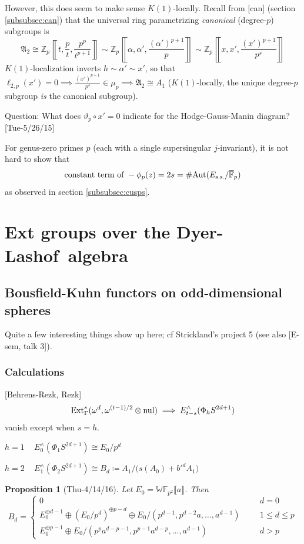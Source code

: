 \documentclass{rs}
\newtheorem{prop}[thm]{Proposition}
\theoremstyle{definition}
\theoremstyle{remark}
\newcommand{\mb}[1]{\mathbb{#1}}
\newcommand{\mf}[1]{\mathfrak{#1}}
\newcommand{\Aut}{{\rm Aut}}
\newcommand{\cF}{\overline {\mb F}}
\newcommand{\DL}{Dyer-Lashof~}
\newcommand{\BF}{{\mb F}}
\newcommand{\BW}{{\mb W}}
\newcommand{\BZ}{{\mb Z}}
\newcommand{\Ext}{{\rm Ext}}
\newcommand{\nul}{{\rm nul}}
\newcommand{\A}{\alpha}
\newcommand{\G}{\Gamma}
\newcommand{\ce}{\coloneqq}
\newcommand{\lb}{\llbracket}
\newcommand{\rb}{\rrbracket}
\renewcommand{\=}{\approx}
\renewcommand{\-}{\sim}
\numberwithin{equation}{section}
\numberwithin{thm}{section}
\begin{document}
However, this does seem to make sense $K(1)$-locally.  
Recall from [can] (section \ref{subsubsec:can}) that the universal ring parametrizing {\em canonical} (degree-$p$) subgroups is 
\[
 {\mf A_2} \cong \BZ_p \left\lb t, \frac{p}{t}, \frac{p^p}{t^{p+1}} \right\rb 
           \sim \BZ_p \left\lb \A, \A', \frac{(\A')^{p + 1}}{p} \right\rb 
           \sim \BZ_p \left\lb x, x', \frac{(x')^{p + 1}}{p^s} \right\rb 
\]
$K(1)$-localization inverts $h \sim \A' \sim x'$, so that $\ell_{2,p}(x') = 0 \implies \frac{(x')^{p + 1}}{p^s} \in \mu_p \implies {\mf A_2} \cong A_1$ 
($K(1)$-locally, the unique degree-$p$ subgroup {\em is} the canonical subgroup).  

Question: What does $\vartheta_p \circ x' = 0$ indicate for the Hodge-Gauss-Manin diagram?  [Tue-5/26/15] 

For genus-zero primes $p$ (each with a single supersingular $j$-invariant), it is not hard to show that 
\[
 \text{constant term of} ~ -\phi_p(z) = 2 s = \# \Aut(E_\text{s.s.}/\cF_p) 
\]
as observed in section \ref{subsubsec:cusps}.  


\newpage

\section{Ext groups over the \DL algebra}

\subsection{Bousfield-Kuhn functors on odd-dimensional spheres}
\label{subsec:BKOS}

Quite a few interesting things show up here; cf Strickland's project 5 (see also [E-sem, talk 3]).  


\subsubsection{Calculations}

[Behrens-Rezk, Rezk] 
\[
 \Ext_\G^s(\omega^d,\omega^{(t - 1) / 2} \otimes \nul) \implies E^\wedge_{t - s}(\Phi_h S^{2 d + 1}) 
\]
vanish except when $s = h$.  

\underline{$h = 1$} ~ $E^\wedge_0(\Phi_1 S^{2 d + 1}) \cong E_0 / p^d$ 

\underline{$h = 2$} ~ $E^\wedge_1(\Phi_2 S^{2 d + 1}) \cong B_d \ce A_1 / \big(s(A_0) + b'^d A_1\big)$ 

\begin{prop}[Thu-4/14/16]
 Let $E_0 = \BW \BF_{p^2} \lb a \rb$.  Then 
 \[
  B_d = \left\{
        \begin{array}{llll}
         0 & & & d = 0 \\
         E_0^{\oplus d - 1} \oplus (E_0 / p^d)^{\oplus p - d} \oplus E_0 / (p^{d - 1}, p^{d - 2} a, \ldots, a^{d - 1}) & & & 1 \leq d \leq p \\
         E_0^{\oplus p - 1} \oplus E_0 / (p^p a^{d - p - 1}, p^{p - 1} a^{d - p}, \ldots, a^{d - 1}) & & & d > p 
        \end{array}
        \right.
 \]
\end{prop}
\end{document}

